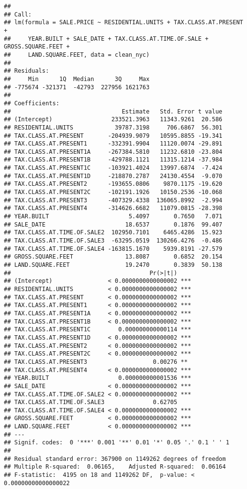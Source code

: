\documentclass[
]{article}
\begin{document}
\begin{verbatim}
## 
## Call:
## lm(formula = SALE.PRICE ~ RESIDENTIAL.UNITS + TAX.CLASS.AT.PRESENT + 
##     YEAR.BUILT + SALE_DATE + TAX.CLASS.AT.TIME.OF.SALE + GROSS.SQUARE.FEET + 
##     LAND.SQUARE.FEET, data = clean_nyc)
## 
## Residuals:
##     Min      1Q  Median      3Q     Max 
## -775674 -321371  -42793  227956 1621763 
## 
## Coefficients:
##                                Estimate   Std. Error t value
## (Intercept)                 233521.3963   11343.9261  20.586
## RESIDENTIAL.UNITS            39787.3198     706.6867  56.301
## TAX.CLASS.AT.PRESENT       -204939.9079   10595.8855 -19.341
## TAX.CLASS.AT.PRESENT1      -332391.9904   11120.0074 -29.891
## TAX.CLASS.AT.PRESENT1A     -267384.5810   11232.6810 -23.804
## TAX.CLASS.AT.PRESENT1B     -429788.1121   11315.1214 -37.984
## TAX.CLASS.AT.PRESENT1C     -103921.4024   13997.6874  -7.424
## TAX.CLASS.AT.PRESENT1D     -218870.2787   24130.4554  -9.070
## TAX.CLASS.AT.PRESENT2      -193655.0806    9870.1175 -19.620
## TAX.CLASS.AT.PRESENT2C     -102191.1926   10150.2536 -10.068
## TAX.CLASS.AT.PRESENT3      -407329.4338  136065.8992  -2.994
## TAX.CLASS.AT.PRESENT4      -314626.6682   11079.0815 -28.398
## YEAR.BUILT                       5.4097       0.7650   7.071
## SALE_DATE                       18.6537       0.1876  99.407
## TAX.CLASS.AT.TIME.OF.SALE2  102950.7101    6465.4286  15.923
## TAX.CLASS.AT.TIME.OF.SALE3  -63295.0519  130266.4276  -0.486
## TAX.CLASS.AT.TIME.OF.SALE4 -163815.1670    5939.8191 -27.579
## GROSS.SQUARE.FEET               13.8087       0.6852  20.154
## LAND.SQUARE.FEET                19.2470       0.3839  50.138
##                                        Pr(>|t|)    
## (Intercept)                < 0.0000000000000002 ***
## RESIDENTIAL.UNITS          < 0.0000000000000002 ***
## TAX.CLASS.AT.PRESENT       < 0.0000000000000002 ***
## TAX.CLASS.AT.PRESENT1      < 0.0000000000000002 ***
## TAX.CLASS.AT.PRESENT1A     < 0.0000000000000002 ***
## TAX.CLASS.AT.PRESENT1B     < 0.0000000000000002 ***
## TAX.CLASS.AT.PRESENT1C        0.000000000000114 ***
## TAX.CLASS.AT.PRESENT1D     < 0.0000000000000002 ***
## TAX.CLASS.AT.PRESENT2      < 0.0000000000000002 ***
## TAX.CLASS.AT.PRESENT2C     < 0.0000000000000002 ***
## TAX.CLASS.AT.PRESENT3                   0.00276 ** 
## TAX.CLASS.AT.PRESENT4      < 0.0000000000000002 ***
## YEAR.BUILT                    0.000000000001536 ***
## SALE_DATE                  < 0.0000000000000002 ***
## TAX.CLASS.AT.TIME.OF.SALE2 < 0.0000000000000002 ***
## TAX.CLASS.AT.TIME.OF.SALE3              0.62705    
## TAX.CLASS.AT.TIME.OF.SALE4 < 0.0000000000000002 ***
## GROSS.SQUARE.FEET          < 0.0000000000000002 ***
## LAND.SQUARE.FEET           < 0.0000000000000002 ***
## ---
## Signif. codes:  0 '***' 0.001 '**' 0.01 '*' 0.05 '.' 0.1 ' ' 1
## 
## Residual standard error: 367900 on 1149262 degrees of freedom
## Multiple R-squared:  0.06165,    Adjusted R-squared:  0.06164 
## F-statistic:  4195 on 18 and 1149262 DF,  p-value: < 0.00000000000000022
\end{verbatim}
\end{document}
